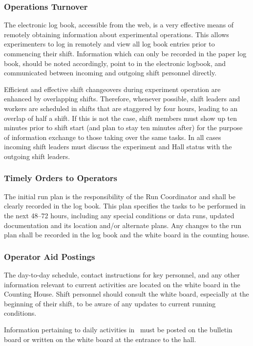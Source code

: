 \documentclass[10pt]{article}
\begin{document}
\subsubsection{Operations Turnover}
The electronic log book, accessible from the web, is a very effective means
of remotely obtaining information about experimental operations. This allows
experimenters to log in remotely and view all log book
entries prior to commencing their shift.
Information which can only be recorded in the paper log book, should be
noted accordingly, point to in the electronic logbook, and communicated between incoming and outgoing shift
personnel directly.

Efficient and effective shift changeovers during experiment operation
are enhanced by overlapping shifts. Therefore, whenever possible, shift leaders
and workers are scheduled in shifts that are staggered by four hours, leading
to an overlap of half a shift.  If this is not the case, shift members must show
up ten minutes prior to shift start (and plan to stay ten minutes after) for the
purpose of information exchange to those taking over the same tasks.
In all cases incoming shift leaders must discuss the experiment and Hall status with the
outgoing shift leaders.

\subsubsection{Timely Orders to Operators}
The initial run plan is the responsibility of the Run Coordinator and
shall be clearly recorded in the log book. This plan specifies
the tasks to be performed in the next 48--72 hours, including
any special conditions or data runs, updated documentation and its
location and/or alternate plans. Any changes to the run plan shall
be recorded in the log book and the white board in the counting house.

\subsubsection{Operator Aid Postings}
The day-to-day schedule, contact instructions for key personnel, and
any other information relevant to current activities are located
on the white board in the Counting House. Shift personnel should
consult the white board, especially at the beginning
of their shift, to be aware of any updates to current running conditions.

Information pertaining to daily activities in \HALL\ must be posted on the
bulletin board or written on the white board at the entrance to the hall.
\end{document}
